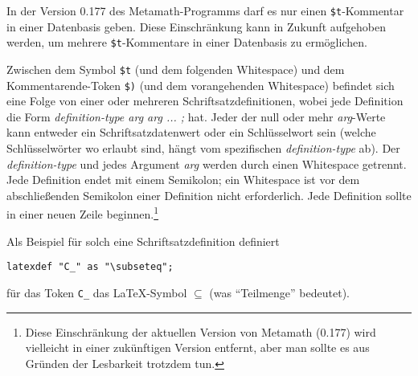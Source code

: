In der Version 0.177 des Metamath-Programms darf es nur einen \texttt{\$t}-Kommentar in einer Datenbasis geben.  Diese Einschränkung kann in Zukunft aufgehoben werden, um mehrere \texttt{\$t}-Kommentare in einer Datenbasis zu ermöglichen.

Zwischen dem Symbol \texttt{\$t} (und dem folgenden Whitespace) und dem Kommentarende-Token \texttt{\$)} (und dem vorangehenden Whitespace) befindet sich eine Folge von einer oder mehreren Schriftsatzdefinitionen, wobei jede Definition die Form \textit{definition-type arg arg ... ;} hat. Jeder der null oder mehr \textit{arg}-Werte kann entweder ein Schriftsatzdatenwert oder ein Schlüsselwort sein (welche Schlüsselwörter wo erlaubt sind, hängt vom spezifischen \textit{definition-type} ab). Der \textit{definition-type} und jedes Argument \textit{arg} werden durch einen Whitespace getrennt. Jede Definition endet mit einem Semikolon; ein Whitespace ist vor dem abschließenden Semikolon einer Definition nicht erforderlich. Jede Definition sollte in einer neuen Zeile beginnen.\footnote{Diese Einschränkung der aktuellen Version von Metamath (0.177) wird vielleicht in einer zukünftigen Version entfernt, aber man sollte es aus Gründen der Lesbarkeit trotzdem tun.}

Als Beispiel für solch eine Schriftsatzdefinition definiert
\begin{center}
 \verb$latexdef "C_" as "\subseteq";$
\end{center}
für das Token \verb$C_$ das \LaTeX-Symbol $\subseteq$ (was "`Teilmenge"' bedeutet).

